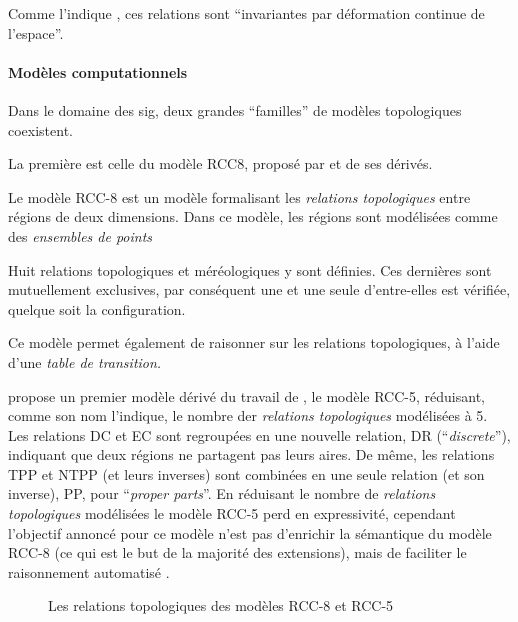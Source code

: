 Comme l'indique \textcite{Duchene2019}, ces relations sont
\enquote{invariantes par déformation continue de l’espace}.



\paragraph{Modèles computationnels}

Dans le domaine des \ac{sig}, deux grandes \enquote{familles} de
modèles topologiques coexistent.

La première est celle du modèle RCC8, proposé par
\textcite{Randell1992} et de ses dérivés.

Le modèle RCC-8 est un modèle formalisant les \emph{relations
  topologiques} entre régions de deux dimensions. Dans ce modèle, les
régions sont modélisées comme des \emph{ensembles de points}


Huit relations topologiques et méréologiques y sont définies. Ces
dernières sont mutuellement exclusives, par conséquent une et une
seule d'entre-elles est vérifiée, quelque soit la configuration.

Ce modèle permet également de raisonner sur les relations
topologiques, à l'aide d'une \emph{table de transition.}


\textcite{Bennett1994} propose un premier modèle dérivé du travail de
\textcite{Randell1992}, le modèle RCC-5, réduisant, comme son nom
l'indique, le nombre der \emph{relations topologiques} modélisées à
5. Les relations DC et EC sont regroupées en une nouvelle relation, DR
(\enquote{\emph{discrete}}), indiquant que deux régions ne partagent
pas leurs aires. De même, les relations TPP et NTPP (et leurs
inverses) sont combinées en une seule relation (et son inverse), PP,
pour \enquote{\emph{proper parts}}. En réduisant le nombre de
\emph{relations topologiques} modélisées le modèle RCC-5 perd en
expressivité, cependant l'objectif annoncé pour ce modèle n'est pas
d’enrichir la sémantique du modèle RCC-8 (ce qui est le but de la
majorité des extensions), mais de faciliter le raisonnement automatisé
\textcite{Bennett1994}.

\begin{figure}
  \centering
  
  \caption{Les relations topologiques des modèles RCC-8 et RCC-5}
  \label{fig:RCC}
\end{figure}

